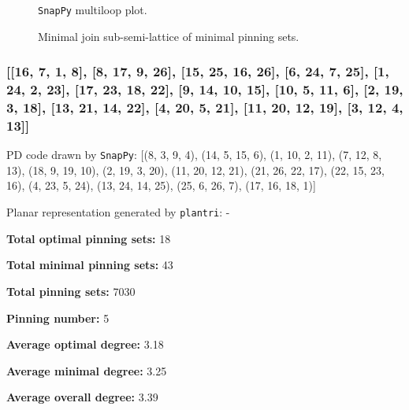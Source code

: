 \documentclass{article}%
\begin{document}
\begin{multicols}{2}
\begin{figure}[H]
\centering

\caption{\texttt{SnapPy} multiloop plot.}
\label{fig:tex/img/[[11, 22, 12, 1], [10, 17, 11, 18], [21, 16, 22, 17], [12, 23, 13, 26], [1, 19, 2, 18], [2, 9, 3, 10], [3, 20, 4, 21], [4, 15, 5, 16], [23, 5, 24, 6], [13, 6, 14, 7], [7, 25, 8, 26], [19, 8, 20, 9], [.svg}
\end{figure}
\columnbreak

\begin{figure}[H]
\centering
\scalebox{0.8}{}
\caption{Minimal join sub-semi-lattice of minimal pinning sets.}
\label{fig:tex/img/[[11, 22, 12, 1], [10, 17, 11, 18], [21, 16, 22, 17], [12, 23, 13, 26], [1, 19, 2, 18], [2, 9, 3, 10], [3, 20, 4, 21], [4, 15, 5, 16], [23, 5, 24, 6], [13, 6, 14, 7], [7, 25, 8, 26], [19, 8, 20, 9], [.pgf}
\end{figure}
\end{multicols}

\newpage

\subsubsection{[[16, 7, 1, 8], [8, 17, 9, 26], [15, 25, 16, 26], [6, 24, 7, 25], [1, 24, 2, 23], [17, 23, 18, 22], [9, 14, 10, 15], [10, 5, 11, 6], [2, 19, 3, 18], [13, 21, 14, 22], [4, 20, 5, 21], [11, 20, 12, 19], [3, 12, 4, 13]]}

{\small\noindent PD code drawn by \texttt{SnapPy}: [(8, 3, 9, 4), (14, 5, 15, 6), (1, 10, 2, 11), (7, 12, 8, 13), (18, 9, 19, 10), (2, 19, 3, 20), (11, 20, 12, 21), (21, 26, 22, 17), (22, 15, 23, 16), (4, 23, 5, 24), (13, 24, 14, 25), (25, 6, 26, 7), (17, 16, 18, 1)]}

{\small\noindent Planar representation generated by \texttt{plantri}: -}

\begin{multicols}{2}
{\normalsize \noindent\textbf{Total optimal pinning sets:} 18

\noindent\textbf{Total minimal pinning sets:} 43

\noindent\textbf{Total pinning sets:} 7030

\noindent\textbf{Pinning number:} 5

}
\columnbreak

{\normalsize \noindent\textbf{Average optimal degree:} 3.18

\noindent\textbf{Average minimal degree:} 3.25

\noindent\textbf{Average overall degree:} 3.39

}
\end{multicols}
\end{document}
